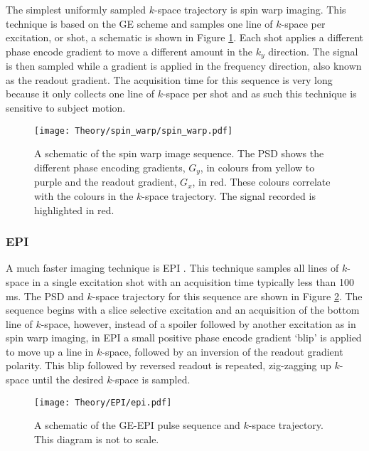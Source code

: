 The simplest uniformly sampled $k$-space trajectory is spin warp imaging. This technique is based on the \ac{GE} scheme and samples one line of $k$-space per excitation, or shot, a schematic is shown in Figure \ref{fig:theory_spin_warp}. Each shot applies a different phase encode gradient to move a different amount in the $k_y$ direction. The signal is then sampled while a gradient is applied in the frequency direction, also known as the readout gradient. The acquisition time for this sequence is very long because it only collects one line of $k$-space per shot and as such this technique is sensitive to subject motion.

\begin{figure}[H]
	\centering
	\texttt{[image: Theory/spin\_warp/spin\_warp.pdf]}
	\caption{A schematic of the spin warp image sequence. The \ac*{PSD} shows the different phase encoding gradients, $G_y$, in colours from yellow to purple and the readout gradient, $G_x$, in red. These colours correlate with the colours in the $k$-space trajectory. The signal recorded is highlighted in red.}
	\label{fig:theory_spin_warp}	
\end{figure}

\subsubsection{\ac*{EPI}}
A much faster imaging technique is \ac{EPI} \cite{mansfield_nmr_1973}. This technique samples all lines of $k$-space in a single excitation shot with an acquisition time typically less than 100 ms. The \ac{PSD} and $k$-space trajectory for this sequence are shown in Figure \ref{fig:theory_epi}. The sequence begins with a slice selective excitation and an acquisition of the bottom line of $k$-space, however, instead of a spoiler followed by another excitation as in spin warp imaging, in \ac{EPI} a small positive phase encode gradient `blip' is applied to move up a line in $k$-space, followed by an inversion of the readout gradient polarity. This blip followed by reversed readout is repeated, zig-zagging up $k$-space until the desired $k$-space is sampled.

\begin{figure}[H]
	\centering
		\texttt{[image: Theory/EPI/epi.pdf]}
	\caption{A schematic of the \ac{GE}-\ac{EPI} pulse sequence and $k$-space trajectory. This diagram is not to scale.}
	\label{fig:theory_epi}	
\end{figure}

